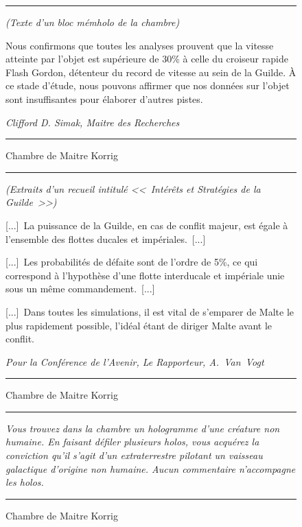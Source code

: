 \documentclass{article}
\newcommand{\newcharacter}{\clearpage\setcounter{figure}{0}}
\newcommand{\indice}[4]{
    \begin{figure}[H]
        \begin{center}
            \rule{0.5\textwidth}{1pt}
        \end{center}
        \begin{framed}
            \begin{samepage}
                \textit{#1}
                \nopagebreak

                #2

                \nopagebreak

                \hfill\textit{#3}
            \end{samepage}
        \end{framed}
        \caption{#4}
        \begin{center}
            \rule{0.5\textwidth}{1pt}
        \end{center}
    \end{figure}
}
\begin{document}
\newcharacter

\indice
{(Texte d'un bloc mémholo de la chambre)}
{Nous confirmons que toutes les analyses prouvent que la vitesse atteinte par
l'objet est supérieure de 30\% à celle du croiseur rapide Flash Gordon,
détenteur du record de vitesse au sein de la Guilde. À ce stade d'étude, nous
pouvons affirmer que nos données sur l'objet sont insuffisantes pour élaborer
d'autres pistes.}
{Clifford D. Simak, Maitre des Recherches}
{Chambre de Maitre Korrig}

\indice
{(Extraits d'un recueil intitulé <<~Intérêts et Stratégies de la Guilde~>>)}
{[...]~La puissance de la Guilde, en cas de conflit majeur, est égale à
l'ensemble des flottes ducales et impériales.~[...]

\nobreak

[...]~Les probabilités de défaite sont de l'ordre de 5\%, ce qui correspond à
l'hypothèse d'une flotte interducale et impériale unie sous un même
commandement.~[...]

\nobreak

[...]~Dans toutes les simulations, il est vital de s'emparer de Malte le plus
rapidement possible, l'idéal étant de diriger Malte avant le conflit.}
{Pour la Conférence de l'Avenir, Le Rapporteur, A.~Van~Vogt}
{Chambre de Maitre Korrig}

\indice
{Vous trouvez dans la chambre un hologramme d'une créature non humaine. En
faisant défiler plusieurs holos, vous acquérez la conviction qu'il s'agit d'un
extraterrestre pilotant un vaisseau galactique d'origine non humaine. Aucun
commentaire n'accompagne les holos.}
{}
{}
{Chambre de Maitre Korrig}
\end{document}
